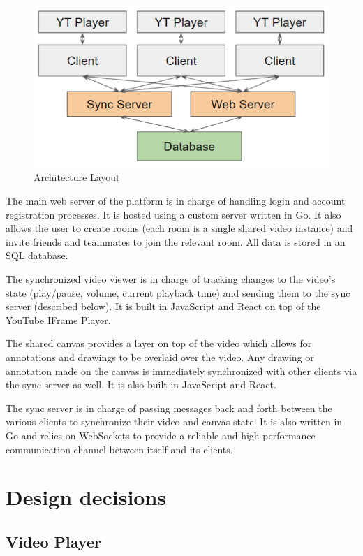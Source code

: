 \documentclass[conference]{IEEEtran}
\begin{document}
  \begin{figure}[H]
      \centering
      \includegraphics[width=\linewidth]{figure1.PNG}
      \caption{Architecture Layout}
      \label{fig:my_label}
  \end{figure}

  The main web server of the platform is in charge of handling login and account registration processes. It is hosted using a custom server written in Go. It also allows the user to create rooms (each room is a single shared video instance) and invite friends and teammates to join the relevant room. All data is stored in an SQL database.

  The synchronized video viewer is in charge of tracking changes to the video's state (play/pause, volume, current playback time) and sending them to the sync server (described below). It is built in JavaScript and React on top of the YouTube IFrame Player.

  The shared canvas provides a layer on top of the video which allows for annotations and drawings to be overlaid over the video. Any drawing or annotation made on the canvas is immediately synchronized with other clients via the sync server as well. It is also built in JavaScript and React.

  The sync server is in charge of passing messages back and forth between the various clients to synchronize their video and canvas state. It is also written in Go and relies on WebSockets to provide a reliable and high-performance communication channel between itself and its clients.

\section{Design decisions}

\subsection{Video Player}
\end{document}
